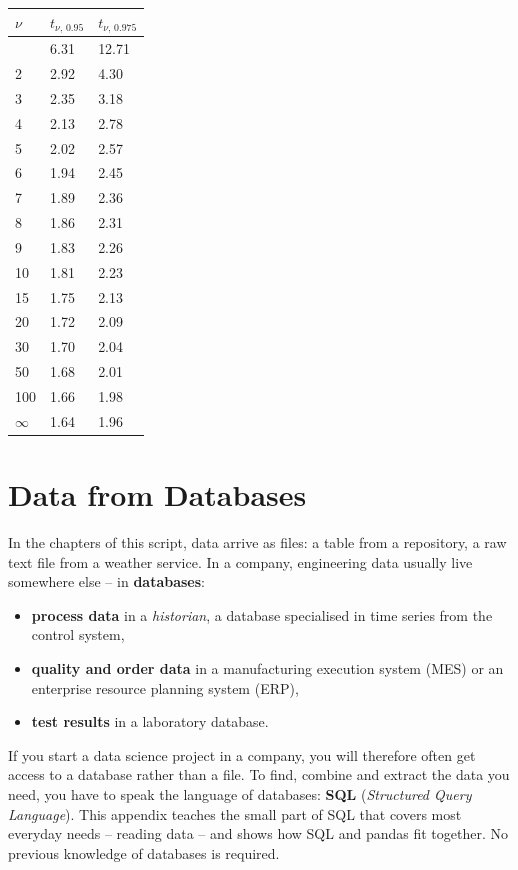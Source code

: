\documentclass[
  letterpaper,
  DIV=11,
  numbers=noendperiod]{scrreprt}
\providecommand{\tightlist}{%
  \setlength{\itemsep}{0pt}\setlength{\parskip}{0pt}}\usepackage{longtable,booktabs,array}
\begin{document}
\begin{longtable}[]{@{}lll@{}}
\toprule\noalign{}
\(\nu\) & \(t_{\nu,\,0.95}\) & \(t_{\nu,\,0.975}\) \\
\midrule\noalign{}
\endhead
\bottomrule\noalign{}
\endlastfoot
1 & 6.31 & 12.71 \\
2 & 2.92 & 4.30 \\
3 & 2.35 & 3.18 \\
4 & 2.13 & 2.78 \\
5 & 2.02 & 2.57 \\
6 & 1.94 & 2.45 \\
7 & 1.89 & 2.36 \\
8 & 1.86 & 2.31 \\
9 & 1.83 & 2.26 \\
10 & 1.81 & 2.23 \\
15 & 1.75 & 2.13 \\
20 & 1.72 & 2.09 \\
30 & 1.70 & 2.04 \\
50 & 1.68 & 2.01 \\
100 & 1.66 & 1.98 \\
\(\infty\) & 1.64 & 1.96 \\
\end{longtable}

\chapter{Data from Databases}\label{sec-databases}

In the chapters of this script, data arrive as files: a table from a
repository, a raw text file from a weather service. In a company,
engineering data usually live somewhere else -- in \textbf{databases}:

\begin{itemize}
\tightlist
\item
  \textbf{process data} in a \emph{historian}, a database specialised in
  time series from the control system,
\item
  \textbf{quality and order data} in a manufacturing execution system
  (MES) or an enterprise resource planning system (ERP),
\item
  \textbf{test results} in a laboratory database.
\end{itemize}

If you start a data science project in a company, you will therefore
often get access to a database rather than a file. To find, combine and
extract the data you need, you have to speak the language of databases:
\textbf{SQL} (\emph{Structured Query Language}). This appendix teaches
the small part of SQL that covers most everyday needs -- reading data --
and shows how SQL and pandas fit together. No previous knowledge of
databases is required.
\end{document}
